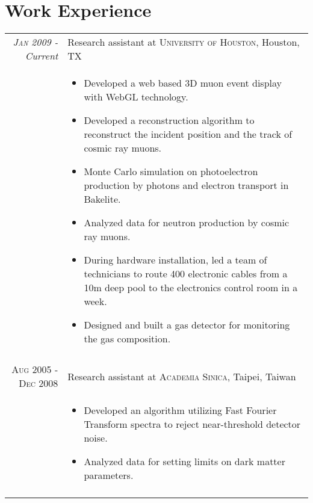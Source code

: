 \documentclass[11pt]{article} %
\begin{document}

\section{Work Experience}

\begin{tabular}{r|p{12cm}}
\emph{\textsc{Jan 2009} - Current} & Research assistant at \textsc{University of Houston}, Houston, TX \\
& \small
\begin{itemize}
  \item Developed a web based 3D muon event display with WebGL technology.
  \item Developed a reconstruction algorithm to reconstruct the incident position and the track of cosmic ray muons.
  \item Monte Carlo simulation on photoelectron production by photons and electron transport in Bakelite.
  \item	Analyzed data for neutron production by cosmic ray muons.
  \item During hardware installation, led a team of technicians to route 400 electronic cables from a 10m deep pool to the electronics control room in a week.
  \item Designed and built a gas detector for monitoring the gas composition.
\end{itemize}\\
\multicolumn{2}{c}{} \\


\textsc{Aug 2005 - Dec 2008} & Research assistant at \textsc{Academia Sinica}, Taipei, Taiwan \\
& \small
\begin{itemize}
  \item Developed an algorithm utilizing Fast Fourier Transform spectra to reject near-threshold detector noise.
  \item Analyzed data for setting limits on dark matter parameters.
\end{itemize}
\\
\multicolumn{2}{c}{} \\
\end{tabular}\newpage
\end{document}
